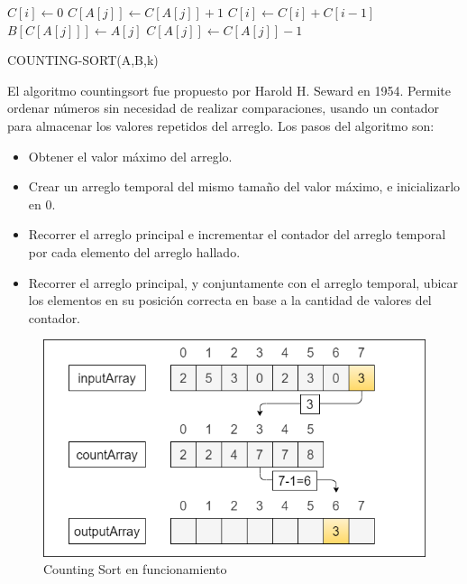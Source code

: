 \documentclass{article}
\begin{document}
		         
		            \begin{algorithm}[H]
                        \begin{algorithmic}[1]
                                \STATE $C[i] \gets 0$
                            \ENDFOR
                                \STATE $C[A[j]] \gets C[A[j]] + 1$
                            \ENDFOR
                                \STATE $C[i] \gets C[i] + C[i - 1]$
                            \ENDFOR
                                \STATE $B[C[A[j]]] \gets A[j]$
                                \STATE $C[A[j]] \gets C[A[j]]-1$
                            \ENDFOR
                        \end{algorithmic}
                        \caption{COUNTING-SORT(A,B,k)}
                        \label{alg:counting-sort}
                    \end{algorithm}
                    El algoritmo countingsort fue propuesto por Harold H. Seward en 1954. Permite ordenar números sin necesidad de realizar comparaciones, usando un contador para almacenar los valores repetidos del arreglo.
                    Los pasos del algoritmo son:
    		        \begin{itemize}
    		            \item Obtener el valor máximo del arreglo.
    		            \item Crear un arreglo temporal del mismo tamaño del valor máximo, e inicializarlo en 0.
    		            \item Recorrer el arreglo principal e incrementar el contador del arreglo temporal por cada elemento del arreglo hallado.
    		            \item Recorrer el arreglo principal, y conjuntamente con el arreglo temporal, ubicar los elementos en su posición correcta en base a la cantidad de valores del contador.
    		        \end{itemize}
    		        \begin{figure}[H]
        				\centering
        				\includegraphics[scale=0.40]{img/countingsort.png}
        				\caption{Counting Sort en funcionamiento}
        				\label{fig:counting_sort_img1}
        			\end{figure}
                    
\end{document}
